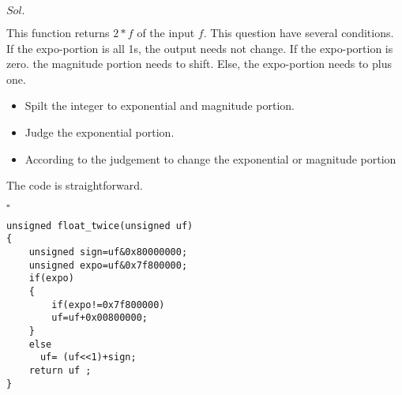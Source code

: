 \documentclass[a4paper, 11pt]{article}
\newenvironment{sol}[1] {\par \noindent $#1.$} {\par \hfill $\square$}
\begin{document}
\begin{sol}{Sol}

This function returns $2*f$ of the input $f$. This question have several conditions. If the expo-portion is all 1s, the output needs not change. If the expo-portion is zero. the magnitude portion needs to shift. Else, the expo-portion needs to plus one.

\begin{itemize}
    \item Spilt the integer to exponential and magnitude portion.
    \item Judge the exponential portion.
    \item According to the judgement to change the exponential or magnitude portion
\end{itemize}

The code is straightforward.
\end{sol}
\begin{lstlisting}
unsigned float_twice(unsigned uf)
{
    unsigned sign=uf&0x80000000;
    unsigned expo=uf&0x7f800000;
    if(expo)
    {
        if(expo!=0x7f800000)
        uf=uf+0x00800000;
    }
    else
      uf= (uf<<1)+sign;
    return uf ;
}

\end{lstlisting}
%
%
%
%
%
%
\end{document}
